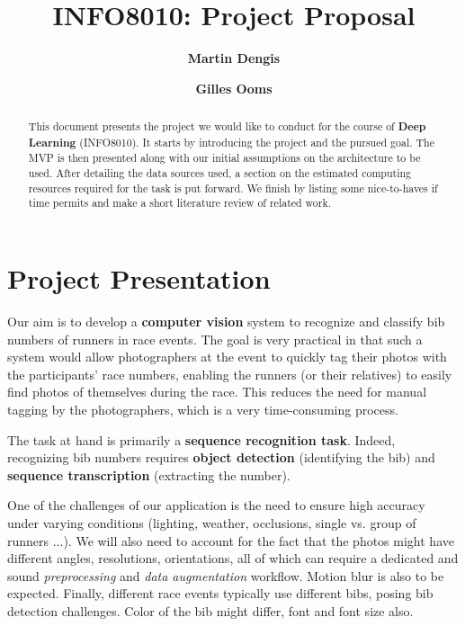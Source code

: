 \documentclass[twocolumn,superscriptaddress,aps]{revtex4-1}
\begin{document}

\title{\Large{INFO8010: Project Proposal}}
\vspace{1cm}
\author{\small{\bf Martin Dengis}}
\author{\small{\bf Gilles Ooms}}

\begin{abstract}
    This document presents the project we would like to conduct for the course of \textbf{Deep Learning} (INFO8010). It starts by introducing the project and the pursued goal. The MVP is then presented along with our initial assumptions on the architecture to be used. After detailing the data sources used, a section on the estimated computing resources required for the task is put forward. We finish by listing some nice-to-haves if time permits and make a short literature review of related work.  
\end{abstract}

\maketitle


\section{Project Presentation}

Our aim is to develop a \textbf{computer vision} system to recognize and classify bib numbers of runners in race events. The goal is very practical in that such a system would allow photographers at the event to quickly tag their photos with the participants' race numbers, enabling the runners (or their relatives) to easily find photos of themselves during the race. This reduces the need for manual tagging by the photographers, which is a very time-consuming process. 

The task at hand is primarily a \textbf{sequence recognition task}. Indeed, recognizing bib numbers requires \textbf{object detection} (identifying the bib) and \textbf{sequence transcription} (extracting the number). 

One of the challenges of our application is the need to ensure high accuracy under varying conditions (lighting, weather, occlusions, single vs. group of runners ...). We will also need to account for the fact that the photos might have different angles, resolutions, orientations, all of which can require a dedicated and sound \textit{preprocessing} and \textit{data augmentation} workflow. Motion blur is also to be expected. Finally, different race events typically use different bibs, posing bib detection challenges. Color of the bib might differ, font and font size also. 
\end{document}
